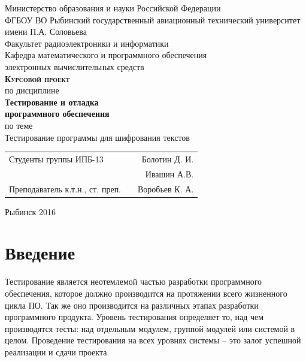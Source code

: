 \documentclass[a4paper,12pt]{article}
\begin{document}
\begin{titlepage}
\newpage


\begin{center}
	\large		
   	Министерство образования и науки Российской Федерации\\[0.5cm]
    	
	ФГБОУ ВО Рыбинский государственный авиационный технический университет имени П.А. Соловьева\\[1.0cm]

	Факультет радиоэлектроники и информатики\\[0.25cm]
		
	Кафедра математического и программного обеспечения\\ электронных вычислительных средств\\[1.5cm]
	
	\Large
	\textbf{\textsc{Курсовой проект}}\\[0.25cm]
	по  дисциплине\\
	\textbf{Тестирование и отладка\\ программного обеспечения}\\[0.5cm]
	
	по теме\\
	Тестирование программы для шифрования текстов
	
\end{center}

\vfill	
\begin{tabularx}{0.95\textwidth}{lXr}
Студенты группы ИПБ-13 			& &	Болотин Д. И.\\
								& &	Ивашин А.В. \\
Преподаватель к.т.н., ст. преп.	& & Воробьев К. А.\\
\end{tabularx}

\vspace{1.5cm}
\center Рыбинск 2016
\end{titlepage}	


\newpage
\setcounter{page}{2}

\tableofcontents

\newpage\section*{Введение}
\par Тестирование является неотемлемой частью разработки программного обеспечения, которое должно производится на протяжении всего жизненного цикла ПО. Так же оно производится на различных этапах разработки программного продукта. Уровень тестирования определяет то, над чем производятся тесты: над отдельным модулем, группой модулей или системой в целом. Проведение тестирования на всех уровнях системы – это залог успешной реализации и сдачи проекта.
\end{document}
